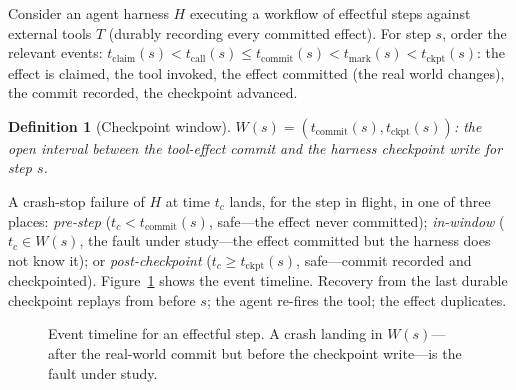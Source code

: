 \documentclass[10pt,journal,compsoc]{IEEEtran}
\newtheorem{definition}{Definition}
\begin{document}
Consider an agent harness $H$ executing a workflow of effectful
steps against external tools $T$ (durably recording every
committed effect). For step $s$, order the relevant events:
$t_{\mathrm{claim}}(s) < t_{\mathrm{call}}(s) \le
t_{\mathrm{commit}}(s) < t_{\mathrm{mark}}(s) <
t_{\mathrm{ckpt}}(s)$: the effect is claimed, the tool invoked,
the effect committed (the real world changes), the commit
recorded, the checkpoint advanced.

\begin{definition}[Checkpoint window]
$W(s) = (t_{\mathrm{commit}}(s), t_{\mathrm{ckpt}}(s))$: the open
interval between the tool-effect commit and the harness
checkpoint write for step $s$.
\end{definition}

A crash-stop failure of $H$ at time $t_c$ lands, for the step in
flight, in one of three places: \emph{pre-step}
($t_c < t_{\mathrm{commit}}(s)$, safe---the effect never
committed); \emph{in-window} ($t_c \in W(s)$, the fault under
study---the effect committed but the harness does not know it);
or \emph{post-checkpoint} ($t_c \ge t_{\mathrm{ckpt}}(s)$,
safe---commit recorded and checkpointed). Figure~\ref{fig:window}
shows the event timeline. Recovery from the last durable
checkpoint replays from before $s$; the agent re-fires the tool;
the effect duplicates.

\begin{figure}[ht]
\centering
{}
\caption{Event timeline for an effectful step. A crash landing
in $W(s)$---after the real-world commit but before the
checkpoint write---is the fault under study.}
\label{fig:window}
\end{figure}
\end{document}
